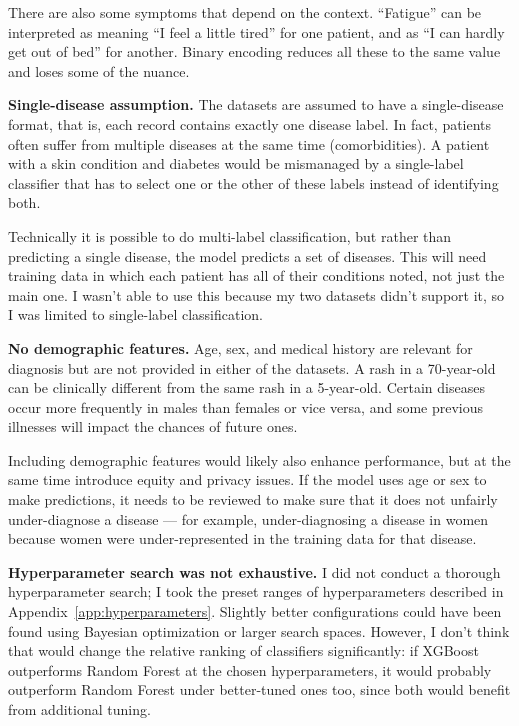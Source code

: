 There are also some symptoms that depend on the context. ``Fatigue'' can be interpreted as meaning ``I feel a little tired'' for one patient, and as ``I can hardly get out of bed'' for another. Binary encoding reduces all these to the same value and loses some of the nuance.

\textbf{Single-disease assumption.} The datasets are assumed to have a single-disease format, that is, each record contains exactly one disease label. In fact, patients often suffer from multiple diseases at the same time (comorbidities). A patient with a skin condition and diabetes would be mismanaged by a single-label classifier that has to select one or the other of these labels instead of identifying both.

Technically it is possible to do multi-label classification, but rather than predicting a single disease, the model predicts a set of diseases. This will need training data in which each patient has all of their conditions noted, not just the main one. I wasn't able to use this because my two datasets didn't support it, so I was limited to single-label classification.

\textbf{No demographic features.} Age, sex, and medical history are relevant for diagnosis but are not provided in either of the datasets. A rash in a 70-year-old can be clinically different from the same rash in a 5-year-old. Certain diseases occur more frequently in males than females or vice versa, and some previous illnesses will impact the chances of future ones.

Including demographic features would likely also enhance performance, but at the same time introduce equity and privacy issues. If the model uses age or sex to make predictions, it needs to be reviewed to make sure that it does not unfairly under-diagnose a disease --- for example, under-diagnosing a disease in women because women were under-represented in the training data for that disease.

\textbf{Hyperparameter search was not exhaustive.} I did not conduct a thorough hyperparameter search; I took the preset ranges of hyperparameters described in Appendix~\ref{app:hyperparameters}. Slightly better configurations could have been found using Bayesian optimization or larger search spaces. However, I don't think that would change the relative ranking of classifiers significantly: if XGBoost outperforms Random Forest at the chosen hyperparameters, it would probably outperform Random Forest under better-tuned ones too, since both would benefit from additional tuning.

